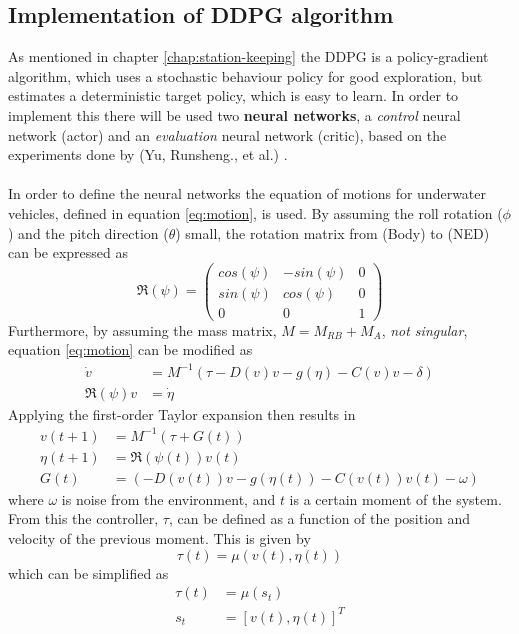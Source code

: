 \subsection{Implementation of DDPG algorithm}
As mentioned in chapter \ref{chap:station-keeping} the DDPG is a policy-gradient algorithm, which uses a stochastic behaviour policy for good exploration, but estimates a deterministic target policy, which is easy to learn. In order to implement this there will be used two \textbf{neural networks}, a \textit{control} neural network (actor) and an \textit{evaluation} neural network (critic), based on the experiments done by (Yu, Runsheng., et al.) \cite{Yu}.\\\\
In order to define the neural networks the equation of motions for underwater vehicles, defined in equation \ref{eq:motion}, is used. By assuming the roll rotation ($\phi$) and the pitch direction ($\theta$) small, the rotation matrix from (Body) to (NED) can be expressed as
\begin{equation}
    \Re(\psi) = 
    \begin{pmatrix}
    cos(\psi) & -sin(\psi) & 0 \\
    sin(\psi) & cos(\psi) & 0 \\
    0 & 0 & 1
    \end{pmatrix}
\end{equation}
Furthermore, by assuming the mass matrix, $M=M_{RB}+M_{A}$, \textit{not singular}, equation \ref{eq:motion} can be modified as
\begin{align}
    \Dot{v} & = M^{-1}(\tau-D(v)v-g(\eta)-C(v)v-\delta) \\
    \Re(\psi)v & = \Dot{\eta}
\end{align}
Applying the first-order Taylor expansion then results in
\begin{align}
    v(t+1) & = M^{-1}(\tau+G(t)) \\
    \eta(t+1) & = \Re(\psi(t))v(t) \\
    G(t) &= (-D(v(t))v-g(\eta(t))-C(v(t))v(t)-\omega)
\end{align}
where $\omega$ is noise from the environment, and $t$ is a certain moment of the system. From this the controller, $\tau$, can be defined as a function of the position and velocity of the previous moment. This is given by
\begin{equation}
    \tau(t) = \mu(v(t), \eta(t))
\end{equation}
which can be simplified as
\begin{align}
    \tau(t) & = \mu(s_{t}) \\
    s_{t} & = [v(t),\eta(t)]^{T}
    \label{eq:tau}
\end{align}
